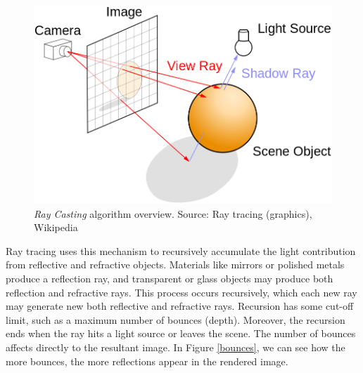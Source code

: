 \documentclass[titlepage,12pt]{report}
\begin{document}
\begin{figure}[!ht]
	\centering
	\includegraphics[scale=0.35]{media/Ray_trace_diagram.png}
	\caption{\textit{Ray Casting} algorithm overview. Source: Ray tracing (graphics), Wikipedia}
	\label{globalilum}
\end{figure}

Ray tracing uses this mechanism to recursively accumulate the light contribution from reflective and refractive objects. Materials like mirrors or polished metals produce a reflection ray, and transparent or glass objects may produce both reflection and refractive rays. This process occurs recursively, which each new ray may generate new both reflective and refractive rays. Recursion has some cut-off limit, such as a maximum number of bounces (depth). Moreover, the recursion ends when the ray hits a light source or leaves the scene. The number of bounces affects directly to the resultant image. In Figure \ref{bounces}, we can see how the more bounces, the more reflections appear in the rendered image.
\end{document}
